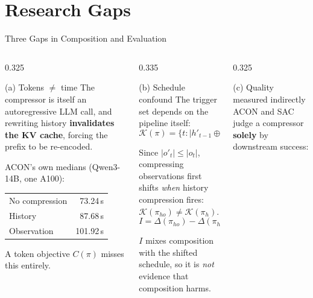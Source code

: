 \documentclass[usenames,dvipsnames,aspectratio=169,10pt]{beamer}
\begin{document}
\section{Research Gaps}

\begin{frame}{Three Gaps in Composition and Evaluation}
\begin{columns}[T]
\begin{column}{0.325\textwidth}
\begin{alertblock}{(a) Tokens $\neq$ time}
\scriptsize
The compressor is itself an autoregressive LLM call, and rewriting history
\textbf{invalidates the KV cache}, forcing the prefix to be re-encoded.
\vspace{0.1cm}

ACON's own medians (Qwen3-14B, one A100):
\vspace{0.05cm}

\centering
\begin{tabular}{lr}
No compression & 73.24\,s\\
History        & 87.68\,s\\
Observation    & 101.92\,s\\
\end{tabular}
\vspace{0.1cm}

\raggedright A token objective $C(\pi)$ misses this entirely.
\end{alertblock}
\end{column}
\begin{column}{0.335\textwidth}
\begin{alertblock}{(b) Schedule confound}
\scriptsize
The trigger set depends on the pipeline itself:
\vspace{-0.15cm}
\[
\mathcal{K}(\pi)=\big\{t : |h'_{t-1}\oplus(o'_t,a_t)|>T_{\mathrm{hist}}\big\}
\]
\vspace{-0.35cm}

Since $|o'_t|\le|o_t|$, compressing observations first shifts \emph{when}
history compression fires: $\mathcal{K}(\pi_{ho})\neq\mathcal{K}(\pi_h)$.
\vspace{-0.1cm}
\[
I=\Delta(\pi_{ho})-\Delta(\pi_h)-\Delta(\pi_o)=\mathbf{-9.5}
\]
\vspace{-0.4cm}

$I$ mixes composition with the shifted schedule, so it is \emph{not} evidence
that composition harms.
\end{alertblock}
\end{column}
\begin{column}{0.325\textwidth}
\begin{alertblock}{(c) Quality measured indirectly}
\scriptsize
ACON and SAC judge a compressor \textbf{solely} by downstream success:
\vspace{0.1cm}


\end{alertblock}
\end{column}
\end{columns}
\end{frame}
\end{document}
